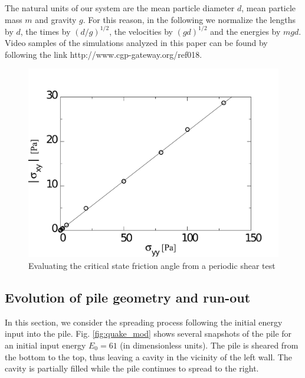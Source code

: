 The natural units of our system are the mean particle diameter $d$, 
mean particle mass $m$ and gravity $g$. For this reason, 
in the following we normalize the lengths by $d$, the times by $(d/g)^{1/2}$, 
the velocities by $(gd)^{1/2}$ and the energies by $mgd$.    
Video samples of the simulations analyzed in this paper
can be found by following the link http://www.cgp-gateway.org/ref018.

\begin{figure}[tbph]
\centering
\includegraphics[width=\textwidth]{Sxy_vs_Syy_Slope}
\caption{Evaluating the critical state friction angle from a periodic shear 
test}
\label{fig:Sxy_vs_Syy_Slope}
\end{figure}

\subsection{Evolution of pile geometry and run-out}
\label{sec:evolution}

In this section, we consider the spreading process following the initial energy 
input into the pile. Fig. \ref{fig:quake_mod} shows several snapshots of the 
pile for an initial input energy $E_0 = 61$ (in dimensionless units).
The pile is sheared from the bottom to the top, thus leaving a cavity in the 
vicinity of the left wall. The cavity is partially filled while the pile 
continues to spread to the right. 


